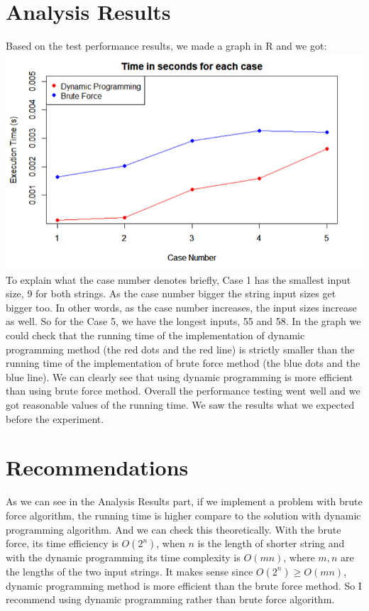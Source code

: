 \documentclass{article}
\begin{document}
\section{\textbf{Analysis Results}}
\indent Based on the test performance results, we made a graph in R and we got: \\
\includegraphics[scale = 0.65]{graph.png} \\
\indent To explain what the case number denotes briefly, Case 1 has the smallest input size, 9 for both strings. As the case number bigger the string input sizes get bigger too. In other words, as the case number increases, the input sizes increase as well. So for the Case 5, we have the longest inputs, 55 and 58. In the graph we could check that the running time of the implementation of dynamic programming method (the red dots and the red line) is strictly smaller than the running time of the implementation of brute force method (the blue dots and the blue line). We can clearly see that using dynamic programming is more efficient than using brute force method. Overall the performance testing went well and we got reasonable values of the running time. We saw the results what we expected before the experiment.

\section{\textbf{Recommendations}}
\indent As we can see in the Analysis Results part, if we implement a problem with brute force algorithm, the running time is higher compare to the solution with dynamic programming algorithm. And we can check this theoretically. With the brute force, its time efficiency is $O(2^n)$, when $n$ is the length of shorter string and with the dynamic programming its time complexity is $O(mn)$, where $m,n$ are the lengths of the two input strings. It makes sense since $O(2^n) \ge O(mn)$, dynamic programming method is more efficient than the brute force method. So I recommend using dynamic programming rather than brute force algorithm.
\end{document}
